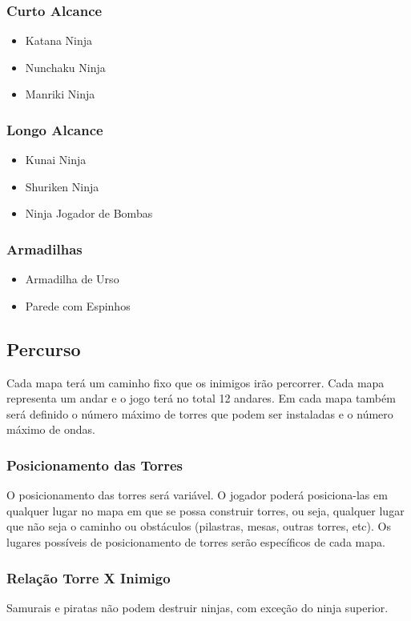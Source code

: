\documentclass[12pt,a4paper]{article}
\begin{document}
\subsubsection{Curto Alcance}
\begin{itemize}
\item Katana Ninja
\item Nunchaku Ninja
\item Manriki Ninja
\end{itemize}

\subsubsection{Longo Alcance}
\begin{itemize}
\item Kunai Ninja
\item Shuriken Ninja
\item Ninja Jogador de Bombas
\end{itemize}

\subsubsection{Armadilhas}
\begin{itemize}
\item Armadilha de Urso
\item Parede com Espinhos
\end{itemize}

\subsection{Percurso}
	Cada mapa terá um caminho fixo que os inimigos irão percorrer. Cada mapa representa um
andar e o jogo terá no total 12 andares. Em cada mapa também será definido o número máximo de
torres que podem ser instaladas e o número máximo de ondas.\\
\subsubsection{Posicionamento das Torres}
	O posicionamento das torres será variável. O jogador poderá posiciona-las em qualquer lugar no
mapa em que se possa construir torres, ou seja, qualquer lugar que não seja o caminho ou obstáculos
(pilastras, mesas, outras torres, etc). Os lugares possíveis de posicionamento de torres serão específicos
de cada mapa.\\
\subsubsection{Relação Torre X Inimigo}
	Samurais e piratas não podem destruir ninjas, com exceção do ninja superior.\\
\end{document}

